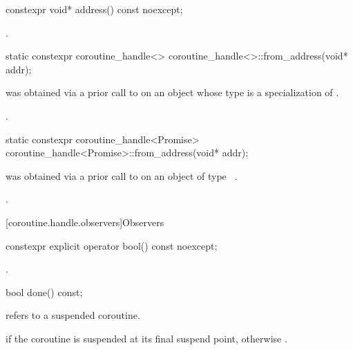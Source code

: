 %
\begin{itemdecl}
constexpr void* address() const noexcept;
\end{itemdecl}

\begin{itemdescr}
\pnum
\returns
{}.
\end{itemdescr}

%
\begin{itemdecl}
static constexpr coroutine_handle<> coroutine_handle<>::from_address(void* addr);
\end{itemdecl}

\begin{itemdescr}
\pnum
\expects
{} was obtained via a prior call to 
on an object whose type is a specialization of .

\pnum
\ensures
{}.
\end{itemdescr}

%
\begin{itemdecl}
static constexpr coroutine_handle<Promise> coroutine_handle<Promise>::from_address(void* addr);
\end{itemdecl}

\begin{itemdescr}
\pnum
\expects
{} was obtained via a prior call to 
on an object of type \cv{}~.

\pnum
\ensures
{}.
\end{itemdescr}

[coroutine.handle.observers]{Observers}

%
\begin{itemdecl}
constexpr explicit operator bool() const noexcept;
\end{itemdecl}

\begin{itemdescr}
\pnum
\returns
{}.
\end{itemdescr}

%
\begin{itemdecl}
bool done() const;
\end{itemdecl}

\begin{itemdescr}
\pnum
\expects
{} refers to a suspended coroutine.

\pnum
\returns
{} if the coroutine is suspended at its
final suspend point, otherwise .
\end{itemdescr}

